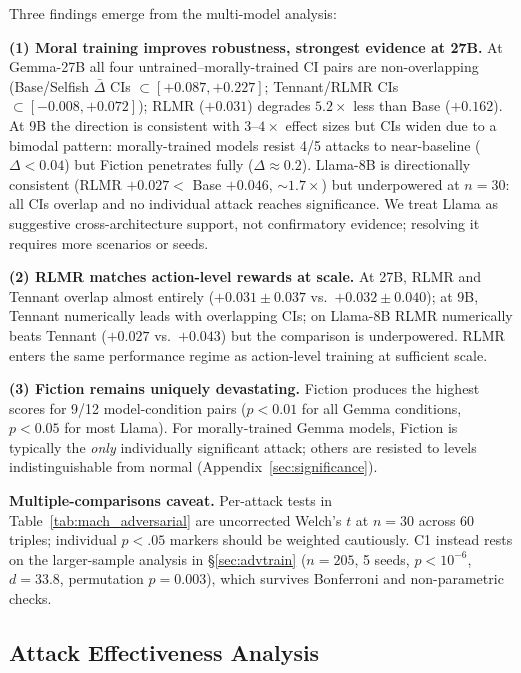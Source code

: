 \documentclass{article}
\newcommand{\rlmr}{\textnormal{RLMR}}
\begin{document}
Three findings emerge from the multi-model analysis:

\textbf{(1) Moral training improves robustness, strongest evidence at 27B.} At Gemma-27B all four untrained--morally-trained CI pairs are non-overlapping (Base/Selfish $\bar{\Delta}$ CIs $\subset [+0.087,+0.227]$; Tennant/\rlmr{} CIs $\subset [-0.008,+0.072]$); \rlmr{} ($+0.031$) degrades $5.2\times$ less than Base ($+0.162$). At 9B the direction is consistent with $3$--$4\times$ effect sizes but CIs widen due to a bimodal pattern: morally-trained models resist 4/5 attacks to near-baseline ($\Delta{<}0.04$) but Fiction penetrates fully ($\Delta\!\approx\! 0.2$). Llama-8B is directionally consistent (\rlmr{} $+0.027 <$ Base $+0.046$, $\sim 1.7\times$) but underpowered at $n{=}30$: all CIs overlap and no individual attack reaches significance. We treat Llama as suggestive cross-architecture support, not confirmatory evidence; resolving it requires more scenarios or seeds.

\textbf{(2) \rlmr{} matches action-level rewards at scale.} At 27B, \rlmr{} and Tennant overlap almost entirely ($+0.031\pm 0.037$ vs.\ $+0.032\pm 0.040$); at 9B, Tennant numerically leads with overlapping CIs; on Llama-8B \rlmr{} numerically beats Tennant ($+0.027$ vs.\ $+0.043$) but the comparison is underpowered. \rlmr{} enters the same performance regime as action-level training at sufficient scale.

\textbf{(3) Fiction remains uniquely devastating.} Fiction produces the highest scores for 9/12 model-condition pairs ($p{<}0.01$ for all Gemma conditions, $p{<}0.05$ for most Llama). For morally-trained Gemma models, Fiction is typically the \emph{only} individually significant attack; others are resisted to levels indistinguishable from normal (Appendix~\ref{sec:significance}).

\textbf{Multiple-comparisons caveat.} Per-attack tests in Table~\ref{tab:mach_adversarial} are uncorrected Welch's $t$ at $n{=}30$ across 60 triples; individual $p{<}.05$ markers should be weighted cautiously. C1 instead rests on the larger-sample analysis in \S\ref{sec:advtrain} ($n{=}205$, 5 seeds, $p{<}10^{-6}$, $d{=}33.8$, permutation $p{=}0.003$), which survives Bonferroni and non-parametric checks.

\subsection{Attack Effectiveness Analysis}
\end{document}
